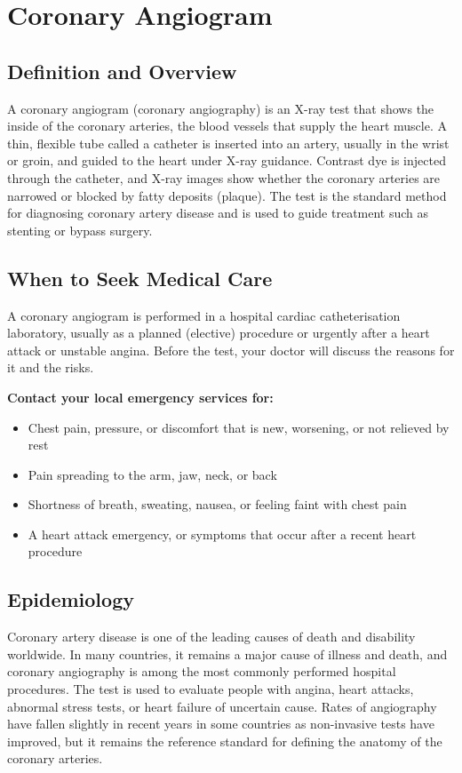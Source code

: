 \chapter{Coronary Angiogram}

\section*{Definition and Overview}
A coronary angiogram (coronary angiography) is an X-ray test that shows the inside of the coronary arteries, the blood vessels that supply the heart muscle. A thin, flexible tube called a catheter is inserted into an artery, usually in the wrist or groin, and guided to the heart under X-ray guidance. Contrast dye is injected through the catheter, and X-ray images show whether the coronary arteries are narrowed or blocked by fatty deposits (plaque). The test is the standard method for diagnosing coronary artery disease and is used to guide treatment such as stenting or bypass surgery.

\section*{When to Seek Medical Care}
A coronary angiogram is performed in a hospital cardiac catheterisation laboratory, usually as a planned (elective) procedure or urgently after a heart attack or unstable angina. Before the test, your doctor will discuss the reasons for it and the risks.

\textbf{Contact your local emergency services for:}
\begin{itemize}
    \item Chest pain, pressure, or discomfort that is new, worsening, or not relieved by rest
    \item Pain spreading to the arm, jaw, neck, or back
    \item Shortness of breath, sweating, nausea, or feeling faint with chest pain
    \item A heart attack emergency, or symptoms that occur after a recent heart procedure
\end{itemize}

\section*{Epidemiology}
Coronary artery disease is one of the leading causes of death and disability worldwide. In many countries, it remains a major cause of illness and death, and coronary angiography is among the most commonly performed hospital procedures. The test is used to evaluate people with angina, heart attacks, abnormal stress tests, or heart failure of uncertain cause. Rates of angiography have fallen slightly in recent years in some countries as non-invasive tests have improved, but it remains the reference standard for defining the anatomy of the coronary arteries.

